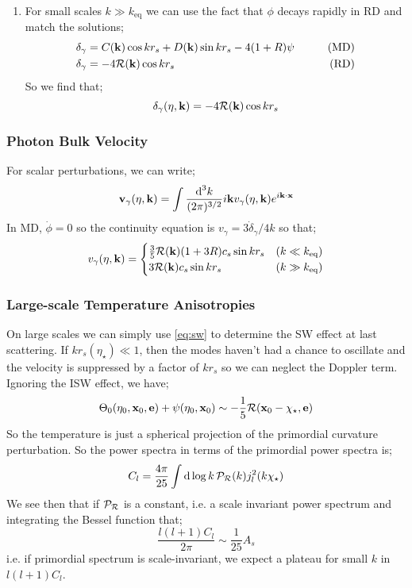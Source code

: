 \begin{enumerate}
\item For small scales $k \gg k_{\text{eq}}$ we can use the fact that $\phi$ decays rapidly in RD and match the solutions;
\begin{align*}
\delta_\gamma &= C(\mathbf{k})\cos kr_s + D(\mathbf{k})\sin kr_s - 4(1 + R)\psi \qquad &(\text{MD})\\
\delta_\gamma &= -4\mathcal{R}(\mathbf{k})\cos kr_s &(\text{RD})
\end{align*}
So we find that;
\begin{equation}
\delta_\gamma(\eta, \mathbf{k}) = -4\mathcal{R}(\mathbf{k})\cos kr_s
\end{equation}
\end{enumerate}
\subsubsection*{Photon Bulk Velocity}
For scalar perturbations, we can write;
\begin{equation*}
\mathbf{v}_\gamma(\eta, \mathbf{k}) = \int{\frac{\text{d}^3 k}{(2\pi)^{3/2}}i\mathbf{k}v_\gamma(\eta, \mathbf{k})e^{i\mathbf{k}\cdot\mathbf{x}}}
\end{equation*}
In MD, $\dot{\phi} = 0$ so the continuity equation is $v_\gamma = 3\dot{\delta}_\gamma / 4k$ so that;
\begin{equation}
v_\gamma(\eta, \mathbf{k}) = \begin{cases}\frac{3}{5}\mathcal{R}(\mathbf{k})(1 + 3R)c_s\sin kr_s&(k \ll k_{\text{eq}})\\3\mathcal{R}(\mathbf{k})c_s\sin kr_s&(k\gg k_{\text{eq}})\end{cases}
\end{equation}
\subsubsection{Large-scale Temperature Anisotropies}
On large scales we can simply use \eqref{eq:sw} to determine the SW effect at last scattering. If $kr_s(\eta_{\star}) \ll 1$, then the modes haven't had a chance to oscillate and the velocity is suppressed by a factor of $kr_s$ so we can neglect the Doppler term. Ignoring the ISW effect, we have;
\begin{equation*}
\Theta_0(\eta_0, \mathbf{x}_0, \mathbf{e}) + \psi(\eta_0, \mathbf{x}_0) \sim -\frac{1}{5}\mathcal{R}(\mathbf{x}_0 - \chi_{\star}, \mathbf{e})
\end{equation*}
So the temperature is just a spherical projection of the primordial curvature perturbation. So the power spectra in terms of the primordial power spectra is;
\begin{equation}
C_l = \frac{4\pi}{25}\int{\text{d}\log k \,\mathcal{P}_{\mathcal{R}}(k)j_l^2(k\chi_{\star})}
\end{equation}
We see then that if $\mathcal{P}_{\mathcal{R}}$ is a constant, i.e. a scale invariant power spectrum and integrating the Bessel function that;
\begin{equation}
\frac{l(l + 1)C_l}{2\pi} \sim \frac{1}{25}A_s
\end{equation}
i.e. if primordial spectrum is scale-invariant, we expect a plateau for small $k$ in $l(l + 1)C_l$. 
